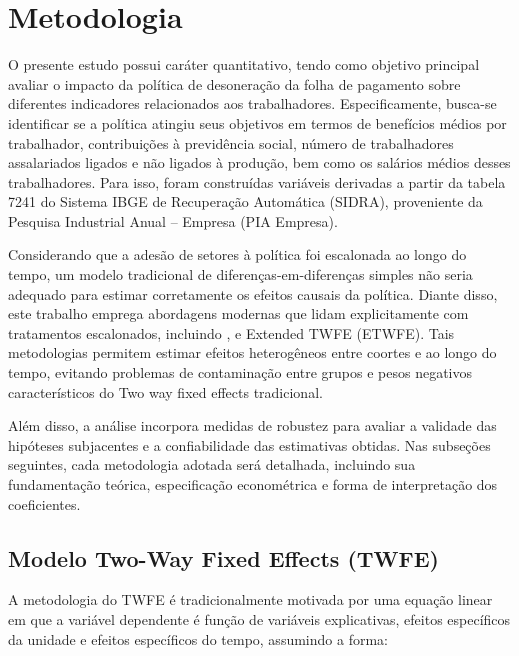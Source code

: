 \documentclass[12pt,a4paper,oneside]{article}
\begin{document}
		
				
		\section{Metodologia}
		
O presente estudo possui caráter quantitativo, tendo como objetivo principal avaliar o impacto da política de desoneração da folha de pagamento sobre diferentes indicadores relacionados aos trabalhadores. Especificamente, busca-se identificar se a política atingiu seus objetivos em termos de benefícios médios por trabalhador, contribuições à previdência social, número de trabalhadores assalariados ligados e não ligados à produção, bem como os salários médios desses trabalhadores. Para isso, foram construídas variáveis derivadas a partir da tabela 7241 do Sistema IBGE de Recuperação Automática (SIDRA), proveniente da Pesquisa Industrial Anual – Empresa (PIA Empresa).

Considerando que a adesão de setores à política foi escalonada ao longo do tempo, um modelo tradicional de diferenças-em-diferenças simples não seria adequado para estimar corretamente os efeitos causais da política. Diante disso, este trabalho emprega abordagens modernas que lidam explicitamente com tratamentos escalonados, incluindo \citet{Callaway2021}, \citet{Sun2021} e Extended TWFE (ETWFE). Tais metodologias permitem estimar efeitos heterogêneos entre coortes e ao longo do tempo, evitando problemas de contaminação entre grupos e pesos negativos característicos do Two way fixed effects tradicional.

Além disso, a análise incorpora medidas de robustez para avaliar a validade das hipóteses subjacentes e a confiabilidade das estimativas obtidas. Nas subseções seguintes, cada metodologia adotada será detalhada, incluindo sua fundamentação teórica, especificação econométrica e forma de interpretação dos coeficientes.
						
		
\subsection{Modelo Two-Way Fixed Effects (TWFE)}

A metodologia do TWFE é tradicionalmente motivada por uma equação linear em que a variável dependente é função de variáveis explicativas, efeitos específicos da unidade e efeitos específicos do tempo, assumindo a forma:
\end{document}
